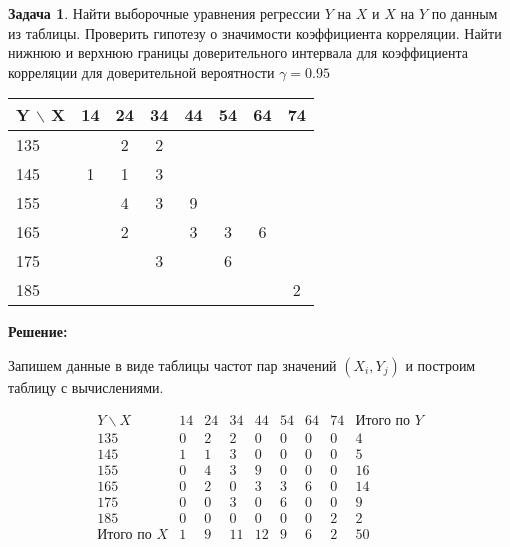 \documentclass[a4paper,11pt]{article}
\newenvironment{shdd}{\begin{mdframed}[backgroundcolor=shadecolor]}{\end{mdframed}}
\theoremstyle{definition}
\newtheorem{problem}{Задача}\setlength{\parindent}{0pt}
\newenvironment{solution}
{\begin{shdd}
     \textbf{Решение:}\par\setlength{\parindent}{0pt}}
     {
\end{shdd}}
\begin{document}
    \vspace{10pt}
    \begin{problem}
        Найти выборочные уравнения регрессии \(Y\) на \(X\) и \(X\) на \(Y\) по данным из таблицы.
        Проверить гипотезу о значимости коэффициента корреляции.
        Найти нижнюю и верхнюю границы доверительного интервала для коэффициента корреляции для доверительной вероятности \(\gamma = 0.95\)

        \begin{table}[H]
            \centering
            \begin{adjustbox}{max width=\textwidth}
                \begin{tabular}{l c c c c c c c}
                    \toprule
                    \textbf{Y} $\backslash$ \textbf{X} & 14 & 24 & 34 & 44 & 54 & 64 & 74 \\
                    \midrule
                    135 &     & 2 & 2 &   &   &   &   \\
                    145 & 1   & 1 & 3 &   &   &   &   \\
                    155 &     & 4 & 3 & 9 &   &   &   \\
                    165 &     & 2 &   & 3 & 3 & 6 &   \\
                    175 &     &   & 3 &   & 6 &   &   \\
                    185 &     &   &   &   &   &   & 2 \\
                    \bottomrule
                \end{tabular}
            \end{adjustbox}\label{tab:table}
        \end{table}


        \begin{solution}
            Запишем данные в виде таблицы частот пар значений $(X_i, Y_j)$ и построим таблицу с вычислениями.

            \[
            \begin{array}{c|ccccccc|c}
            Y \backslash X & 14 & 24 & 34 & 44 & 54 & 64 & 74 & \text{Итого по } Y \\
            \hline
            135 &  0 & 2 & 2 & 0 & 0 & 0 & 0 & 4 \\
            145 &  1 & 1 & 3 & 0 & 0 & 0 & 0 & 5 \\
            155 &  0 & 4 & 3 & 9 & 0 & 0 & 0 & 16 \\
            165 &  0 & 2 & 0 & 3 & 3 & 6 & 0 & 14 \\
            175 &  0 & 0 & 3 & 0 & 6 & 0 & 0 & 9 \\
            185 &  0 & 0 & 0 & 0 & 0 & 0 & 2 & 2 \\
            \hline
            \text{Итого по } X & 1 & 9 & 11 & 12 & 9 & 6 & 2 & 50 \\
            \end{array}
            \]


\end{solution}
\end{problem}
\end{document}
